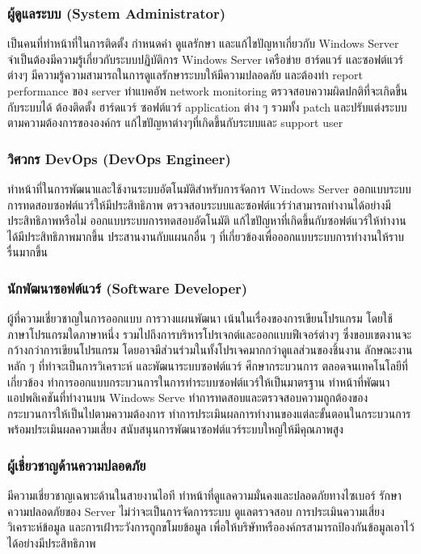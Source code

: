\hspace{0cm}\subsubsection{ผู้ดูแลระบบ (System Administrator)}
เป็นคนที่ทำหน้าที่ในการติดตั้ง กำหนดค่า ดูแลรักษา และแก้ไขปัญหาเกี่ยวกับ Windows Server จำเป็นต้องมีความรู้เกี่ยวกับระบบปฏิบัติการ Windows Server เครือข่าย ฮาร์ดแวร์ และซอฟต์แวร์ต่างๆ มีความรู้ความสามารถในการดูแลรักษาระบบให้มีความปลอดภัย และต้องทำ report performance ของ server ทำแบคอัพ network monitoring ตรวจสอบความผิดปกติที่จะเกิดขึ้นกับระบบได้  ต้องติดตั้ง ฮาร์ดแวร์ ซอฟต์แวร์ application ต่าง ๆ รวมทั้ง patch และปรับแต่งระบบตามความต้องการขององค์กร แก้ไขปัญหาต่างๆที่เกิดขึ้นกับระบบและ support user \cite{job:1}

\hspace{0cm}\subsubsection{วิศวกร DevOps (DevOps Engineer)}ทำหน้าที่ในการพัฒนาและใช้งานระบบอัตโนมัติสำหรับการจัดการ
Windows Server ออกแบบระบบการทดสอบซอฟต์แวร์ให้มีประสิทธิภาพ ตรวจสอบระบบและซอฟต์แวร์ว่าสามารถทำงานได้อย่างมีประสิทธิภาพหรือไม่ 
ออกแบบระบบการทดสอบอัตโนมัติ แก้ไขปัญหาที่เกิดขึ้นกับซอฟต์แวร์ให้ทำงานได้มีประสิทธิภาพมากขึ้น ประสานงานกับแผนกอื่น ๆ ที่เกี่ยวข้องเพื่อออกแบบระบบการทำงานให้ราบรื่นมากขึ้น \cite{job:2}

\hspace{0cm}\subsubsection{นักพัฒนาซอฟต์แวร์ (Software Developer)}ผู้ที่ความเชี่ยวชาญในการออกแบบ การวางแผนพัฒนา เน้นในเรื่องของการเขียนโปรแกรม โดยใช้ภาษาโปรแกรมใดภาษาหนึ่ง รวมไปถึงการบริหารโปรเจกต์และออกแบบฟีเจอร์ต่างๆ ซึ่งขอบเขตงานจะกว้างกว่าการเขียนโปรแกรม โดยอาจมีส่วนร่วมในทั้งโปรเจคมากกว่าดูแลส่วนของชิ้นงาน ลักษณะงานหลัก ๆ ที่ทำจะเป็นการวิเคราะห์ และพัฒนาระบบซอฟต์แวร์ ศึกษากระบวนการ ตลอดจนเทคโนโลยีที่เกี่ยวข้อง ทำการออกแบบกระบวนการในการทำระบบซอฟต์แวร์ให้เป็นมาตรฐาน ทำหน้าที่พัฒนาแอปพลิเคชันที่ทำงานบน Windows Serve ทำการทดสอบและตรวจสอบความถูกต้องของกระบวนการให้เป็นไปตามความต้องการ ทำการประเมินผลการทำงานของแต่ละขั้นตอนในกระบวนการ พร้อมประเมินผลความเสี่ยง สนับสนุนการพัฒนาซอฟต์แวร์ระบบใหญ่ให้มีคุณภาพสูง \cite{job:3}
\clearpage
\hspace{0cm}\subsubsection{ผู้เชี่ยวชาญด้านความปลอดภัย}มีความเชี่ยวชาญเฉพาะด้านในสายงานไอที ทำหน้าที่ดูแลความมั่นคงและปลอดภัยทางไซเบอร์ รักษาความปลอดภัยของ Server ไม่ว่าจะเป็นการจัดการระบบ ดูแลตรวจสอบ การประเมินความเสี่ยง วิเคราะห์ข้อมูล และการเฝ้าระวังการถูกขโมยข้อมูล เพื่อให้บริษัทหรือองค์กรสามารถป้องกันข้อมูลเอาไว้ได้อย่างมีประสิทธิภาพ \cite{job:4}

